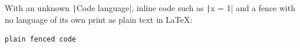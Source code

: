 With an unknown \texttt|Code language|, inline code such as \texttt|x = 1| and a fence with no
language of its own print as plain text in LaTeX:

\begin{verbatim}
plain fenced code
\end{verbatim}

